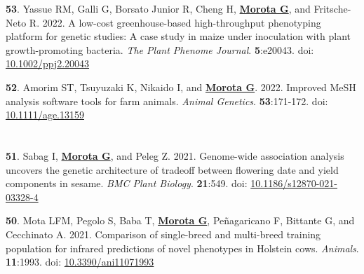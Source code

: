 \documentclass[margin,line,10pt]{res}
\newenvironment{list1}{
  \begin{list}{\ding{113}}{%
      \setlength{\itemsep}{0in}
      \setlength{\parsep}{0in} \setlength{\parskip}{0in}
      \setlength{\topsep}{0in} \setlength{\partopsep}{0in} 
      \setlength{\leftmargin}{0.17in}}}{\end{list}}
\begin{document}
\begin{resume}
\begin{list1}
    \vspace{0.5cm}


\item [{\bf 53}.] Yassue RM, Galli G, Borsato Junior R, Cheng H, \textbf{\underline{Morota G}}, and Fritsche-Neto R. 2022. A low-cost greenhouse-based high-throughput phenotyping platform for genetic studies: A case study in maize under inoculation with plant growth-promoting bacteria. \emph{The Plant Phenome Journal}. \textbf{5}:e20043. doi: \textcolor{blue}{\href{https://doi.org/10.1002/ppj2.20043}{10.1002/ppj2.20043}}  
  
  \vspace{0.5cm}

             
\item [{\bf 52}.] Amorim ST, Tsuyuzaki K, Nikaido I, and \textbf{\underline{Morota G}}. 2022. Improved MeSH analysis software tools for farm animals.  \emph{Animal Genetics}. \textbf{53}:171-172. doi: \textcolor{blue}{\href{https://doi.org/10.1111/age.13159}{10.1111/age.13159}} 

\end{list1}





\section{}
\begin{list1}

    \item [{\bf 51}.] Sabag I, \textbf{\underline{Morota G}}, and Peleg Z. 2021. Genome-wide association analysis uncovers the genetic architecture of tradeoff between flowering date and yield components in sesame.  \emph{BMC Plant Biology}. \textbf{21}:549. doi: \textcolor{blue}{\href{https://doi.org/10.1186/s12870-021-03328-4}{10.1186/s12870-021-03328-4}} 

      \vspace{0.5cm}

\item [{\bf 50}.] Mota LFM, Pegolo S, Baba T, \textbf{\underline{Morota G}}, Pe\~{n}agaricano F, Bittante G, and Cecchinato A. 2021. Comparison of single-breed and multi-breed training population for infrared predictions of novel phenotypes in Holstein cows. \emph{Animals}. \textbf{11}:1993. doi: \textcolor{blue}{\href{https://doi.org/10.3390/ani11071993}{10.3390/ani11071993}}

      \vspace{0.5cm}
  

\end{list1}
\end{resume}
\end{document}
